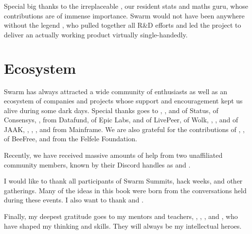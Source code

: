 Special big thanks to the irreplaceable , our resident stats and maths guru, whose contributions are of immense importance. Swarm would not have been anywhere without the legend , who pulled together all R\&D efforts and led the project to deliver an actually working product virtually single-handedly.



\section*{Ecosystem}

Swarm has always attracted a wide community of enthusiasts as well as an ecosystem of companies and projects whose support and encouragement kept us alive during some dark days. 
Special thanks goes to , , and  of Status,  of Consensys, ,  from Datafund,  of Epic Labs,  and  of LivePeer,  of Wolk, , ,  and  of JAAK, , , , and  from Mainframe. We are also grateful for the contributions of , ,  of BeeFree, and  from the Felfele Foundation. 

Recently, we have received massive amounts of help from two unaffiliated community members, known by their Discord handles as  and .

I would like to thank all participants of Swarm Summits, hack weeks, and other gatherings. Many of the ideas in this book were born from the conversations held during these events. I also want to thank  and .

Finally, my deepest gratitude goes to my mentors and teachers, , , , and , who have shaped my thinking and skills. They will always be my intellectual heroes.

